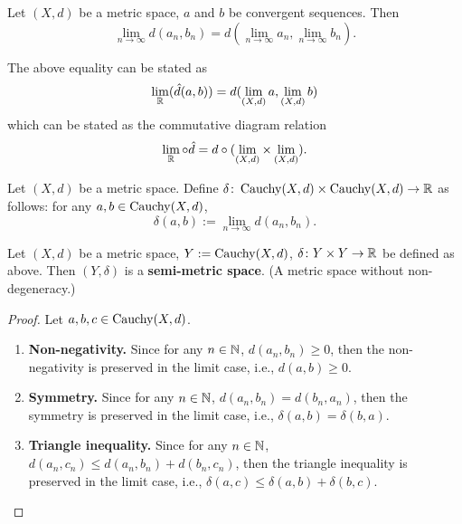 \begin{corollary}
  Let $(X, d)$ be a metric space, $a$ and $b$ be convergent sequences.
  Then
  \begin{equation}
    \lim_{n \to \infty} d(a_n, b_n)
    = d\left(\lim_{n \to \infty} a_n, \lim_{n \to \infty} b_n\right).
  \end{equation}
\end{corollary}
\begin{remark}
  The above equality can be stated as
  \begin{equation}
    \lim_{\mathbb{R}}(\hat{d}(a, b)) = d(\lim_{(X, d)} a, \lim_{(X, d)} b)
  \end{equation}
  which can be stated as the commutative diagram relation
  \begin{equation}
    \lim_{\mathbb{R}} \circ \hat{d} = d \circ (\lim_{(X, d)} \times \lim_{(X, d)}).
  \end{equation}
\end{remark}
\begin{definition}
  Let $(X, d)$ be a metric space.
  Define $\delta \colon \mathop{\rm Cauchy}\nolimits(X, d) \times \mathop{\rm Cauchy}\nolimits(X, d) \to \mathbb{R}$ as follows:
  for any $a, b \in \mathop{\rm Cauchy}\nolimits(X, d)$,
  \begin{equation}
    \delta(a, b) := \lim_{n \to \infty} d(a_n, b_n).
  \end{equation}
\end{definition}
\begin{proposition}
  Let
    $(X, d)$ be a metric space,
    $Y := \mathop{\rm Cauchy}\nolimits(X, d)$,
    $\delta \colon Y \times Y \to \mathbb{R}$ be defined as above.
  Then $(Y, \delta)$ is a \textbf{semi-metric space}.
  (A metric space without non-degeneracy.)
\end{proposition}
\begin{proof}
  Let $a, b, c \in \mathop{\rm Cauchy}\nolimits(X, d)$.
  \begin{enumerate}
    \item
      \textbf{Non-negativity.}
      Since for any $n \in \mathbb{N}$, $d(a_n, b_n) \geq 0$,
      then the non-negativity is preserved in the limit case,
      i.e., $d(a, b) \geq 0$.
    \item
      \textbf{Symmetry.}
      Since for any $n \in \mathbb{N}$, $d(a_n, b_n) = d(b_n, a_n)$,
      then the symmetry is preserved in the limit case,
      i.e., $\delta(a, b) = \delta(b, a)$.
    \item
      \textbf{Triangle inequality.}
      Since for any $n \in \mathbb{N}$, $d(a_n, c_n) \leq d(a_n, b_n) + d(b_n, c_n)$,
      then the triangle inequality is preserved in the limit case,
      i.e., $\delta(a, c) \leq \delta(a, b) + \delta(b, c)$.
  \end{enumerate}
\end{proof}
